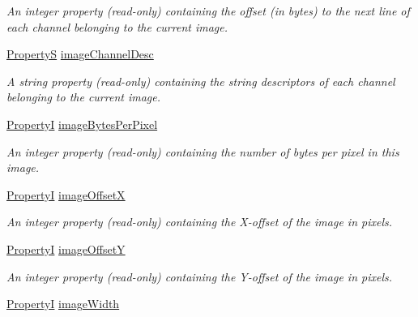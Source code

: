 \begin{DoxyCompactItemize}
\begin{DoxyCompactList}\small\item\em An integer property {\bfseries }(read-\/only) containing the offset (in bytes) to the next line of each channel belonging to the current image. \end{DoxyCompactList}\item 
\hyperlink{classmv_i_m_p_a_c_t_1_1acquire_1_1_property_s}{Property\+S} \hyperlink{classmv_i_m_p_a_c_t_1_1acquire_1_1_request_ac0e635d0a9be516925d40c5d1b77b1da}{image\+Channel\+Desc}
\begin{DoxyCompactList}\small\item\em A string property {\bfseries }(read-\/only) containing the string descriptors of each channel belonging to the current image. \end{DoxyCompactList}\item 
\hypertarget{classmv_i_m_p_a_c_t_1_1acquire_1_1_request_a85e4317ddfdd7d8d67c3a2fae94d8045}{\hyperlink{group___common_interface_ga12d5e434238ca242a1ba4c6c3ea45780}{Property\+I} \hyperlink{classmv_i_m_p_a_c_t_1_1acquire_1_1_request_a85e4317ddfdd7d8d67c3a2fae94d8045}{image\+Bytes\+Per\+Pixel}}\label{classmv_i_m_p_a_c_t_1_1acquire_1_1_request_a85e4317ddfdd7d8d67c3a2fae94d8045}

\begin{DoxyCompactList}\small\item\em An integer property {\bfseries }(read-\/only) containing the number of bytes per pixel in this image. \end{DoxyCompactList}\item 
\hyperlink{group___common_interface_ga12d5e434238ca242a1ba4c6c3ea45780}{Property\+I} \hyperlink{classmv_i_m_p_a_c_t_1_1acquire_1_1_request_a1d51bca84206dbed070f85751dbdbb92}{image\+Offset\+X}
\begin{DoxyCompactList}\small\item\em An integer property {\bfseries }(read-\/only) containing the X-\/offset of the image in pixels. \end{DoxyCompactList}\item 
\hyperlink{group___common_interface_ga12d5e434238ca242a1ba4c6c3ea45780}{Property\+I} \hyperlink{classmv_i_m_p_a_c_t_1_1acquire_1_1_request_a6f815967e03ba2d74ffbe66006a30ac1}{image\+Offset\+Y}
\begin{DoxyCompactList}\small\item\em An integer property {\bfseries }(read-\/only) containing the Y-\/offset of the image in pixels. \end{DoxyCompactList}\item 
\hypertarget{classmv_i_m_p_a_c_t_1_1acquire_1_1_request_a3b55253e7d176517fd60ddae724f974c}{\hyperlink{group___common_interface_ga12d5e434238ca242a1ba4c6c3ea45780}{Property\+I} \hyperlink{classmv_i_m_p_a_c_t_1_1acquire_1_1_request_a3b55253e7d176517fd60ddae724f974c}{image\+Width}}\label{classmv_i_m_p_a_c_t_1_1acquire_1_1_request_a3b55253e7d176517fd60ddae724f974c}


\end{DoxyCompactItemize}
